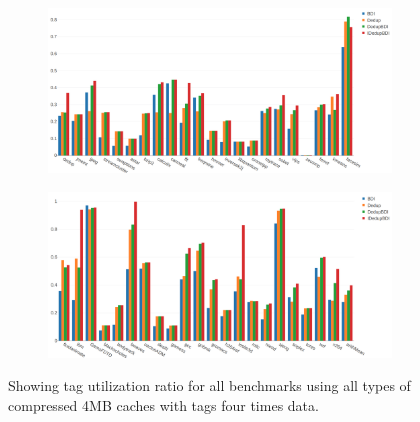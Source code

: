 \begin{figure}
    \begin{subfigure}{\textwidth}
        \includegraphics[width=\textwidth]{all-tagutil1.png}
    \end{subfigure}
    \begin{subfigure}{\textwidth}
        \includegraphics[width=\textwidth]{all-tagutil2.png}
    \end{subfigure}
    \caption[All benchmarks: Tag Utilization]{Showing tag utilization ratio for all benchmarks using all types of compressed 4MB caches with tags four times data.}
    \label{fig:all_tagutil}
\end{figure}
